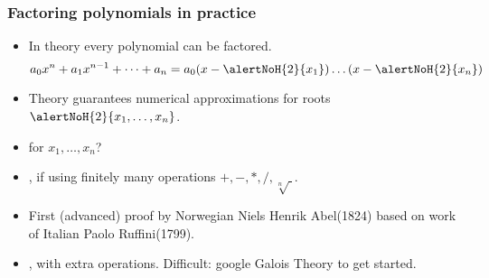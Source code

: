\begin{frame}
\frametitle{Factoring polynomials in practice}
\begin{itemize}
\item In theory every polynomial can be factored.
\[a_0 x^{n}+a_1x^{n-1}+\dots + a_n=a_0 (x- \alertNoH{2}{x_1} )\dots (x-\alertNoH{2}{ x_n} )
\]
\item<2-> Theory guarantees numerical approximations for roots $\alertNoH{2}{ x_1,\dots, x_n} $. 
\item<3->  for $x_1, \dots, x_n$?
\item<4-> , if using finitely many operations $+,-,*,/,\sqrt[n]{~}$.
\item<5-> First (advanced) proof by Norwegian Niels Henrik Abel(1824) based on work of Italian Paolo Ruffini(1799). 
\item<6-> \footnotesize{ , with extra operations. Difficult: google Galois Theory to get started.}
\end{itemize}
\end{frame}
